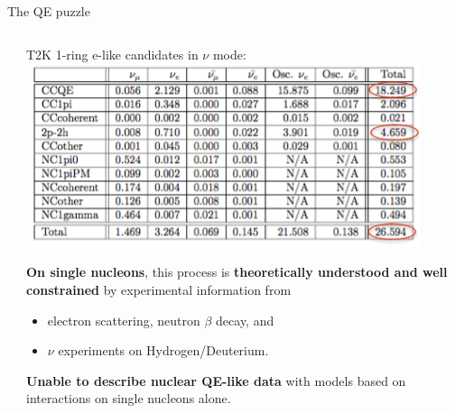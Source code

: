 \begin{frame}{The QE puzzle}
\begin{columns}
\begin{column}{0.42\textwidth}
\begin{center}
      \end{center}
    \end{column}
    \begin{column}{0.58\textwidth}
      {\scriptsize
       \begin{center}
         {\color{cadmiumred} T2K 1-ring e-like candidates in $\nu$ mode}:\\
         \includegraphics[width=0.90\textwidth]{./images/nuint/other/T2KFHC1ReRun1to7_annotated}\\
       \end{center}
       {\bf On single nucleons}, this process is {\bf theoretically understood and
       well constrained} by experimental information from
       \begin{itemize}
          \item electron scattering, neutron $\beta$ decay, and
          \item $\nu$ experiments on Hydrogen/Deuterium.
       \end{itemize}
       {\bf Unable to describe nuclear QE-like data} with models
       based on interactions on single nucleons alone.\\
     }
    \end{column}
  \end{columns}

\end{frame}


